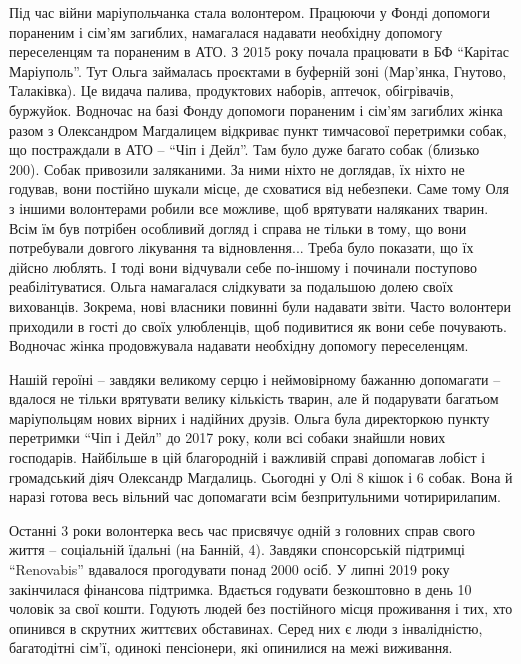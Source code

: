 Під час війни маріупольчанка стала волонтером. Працюючи у Фонді допомоги
пораненим і сім'ям загиблих, намагалася надавати необхідну допомогу
переселенцям та пораненим в АТО. З 2015 року почала працювати в БФ \enquote{Карітас
Маріуполь}. Тут Ольга займалась проєктами в буферній зоні (Мар'янка, Гнутово,
Талаківка). Це видача палива, продуктових наборів, аптечок, обігрівачів,
буржуйок. Водночас на базі Фонду допомоги пораненим і сім'ям загиблих жінка
разом з Олександром Магдалицем відкриває пункт тимчасової перетримки собак, що
постраждали в АТО – \enquote{Чіп і Дейл}. Там було дуже багато собак (близько 200).
Собак привозили заляканими. За ними ніхто не доглядав, їх ніхто не годував,
вони постійно шукали місце, де сховатися від небезпеки. Саме тому Оля з іншими
волонтерами робили все можливе, щоб врятувати наляканих тварин. Всім їм був
потрібен особливий догляд і справа не тільки в тому, що вони потребували
довгого лікування та відновлення... Треба було показати, що їх дійсно люблять. І
тоді вони відчували себе по-іншому і починали поступово реабілітуватися. Ольга
намагалася слідкувати за подальшою долею своїх вихованців. Зокрема, нові
власники повинні були надавати звіти. Часто волонтери приходили в гості до
своїх улюбленців, щоб подивитися як вони себе почувають. Водночас жінка
продовжувала надавати необхідну допомогу переселенцям.

Нашій героїні – завдяки великому серцю і  неймовірному бажанню допомагати –
вдалося не тільки врятувати велику кількість тварин, але й подарувати багатьом
маріупольцям нових вірних і надійних друзів. Ольга була директоркою пункту
перетримки \enquote{Чіп і Дейл} до 2017 року, коли всі собаки знайшли нових господарів.
Найбільше в цій благородній і важливій справі допомагав лобіст і громадський
діяч Олександр Магдалиць. Сьогодні у Олі 8 кішок і 6 собак. Вона й наразі
готова весь вільний час допомагати всім безпритульними чотиририлапим.


Останні 3 роки волонтерка весь час присвячує одній з головних справ свого життя
– соціальній їдальні (на Банній, 4). Завдяки спонсорській  підтримці
\enquote{Renovabis} вдавалося прогодувати понад 2000 осіб. У липні 2019 року
закінчилася фінансова  підтримка. Вдається годувати безкоштовно в день 10
чоловік за свої кошти. Годують людей без постійного місця проживання і тих, хто
опинився в скрутних життєвих обставинах. Серед них є люди з інвалідністю,
багатодітні сім'ї, одинокі пенсіонери, які опинилися на межі виживання.


